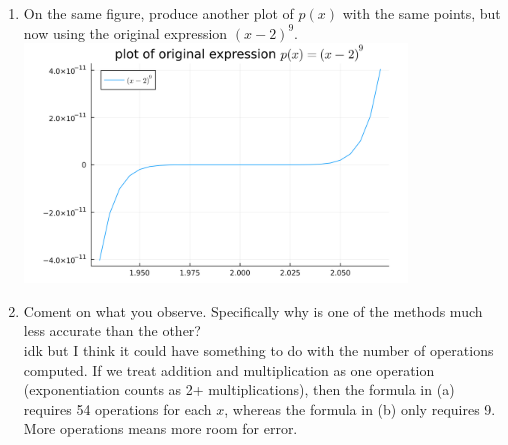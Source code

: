 \documentclass[11pt]{article}
\newcommand{\n}{\vspace{0.3cm}}
\begin{document}
\begin{enumerate}
\begin{enumerate}
		      \item On the same figure, produce another plot of \(p(x)\) with the same points, but now using the original expression \((x-2)^9\). \n\\
		            \includegraphics[width=0.8\textwidth]{original.png}

		      \item Coment on what you observe.  Specifically why is one of the methods much less accurate than the other? \n\\
		            idk but I think it could have something to do with the number of operations computed.  If we treat addition and multiplication as one operation (exponentiation counts as 2+ multiplications), then the formula in (a) requires 54 operations for each \(x\), whereas the formula in (b) only requires 9.  More operations means more room for error.
	      \end{enumerate}
\end{enumerate}
\end{document}
